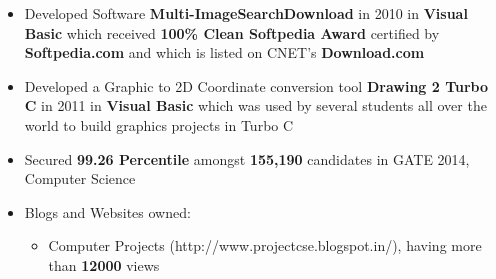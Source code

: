 \begin{itemize}
	\item Developed Software \textbf{Multi-ImageSearchDownload} in 2010 in \textbf{Visual Basic} which received \textbf{100\% Clean Softpedia Award} certified by \textbf{Softpedia.com} and which is listed on CNET's \textbf{Download.com} \\[-0.6cm]
	\item Developed a Graphic to 2D Coordinate conversion tool \textbf{Drawing 2 Turbo C} in 2011 in \textbf{Visual Basic}  which was used by several students all over the world to build graphics projects in Turbo C \\[-0.6cm]
	\item Secured \textbf{99.26 Percentile} amongst \textbf{155,190} candidates in GATE 2014, Computer Science \\[-0.6cm]
	\item Blogs and Websites owned: \\[-0.6cm]
	\begin{itemize}
		\item Computer Projects (http://www.projectcse.blogspot.in/), having more than \textbf{12000} views \\[-0.4cm]
	\end{itemize}
\end{itemize}